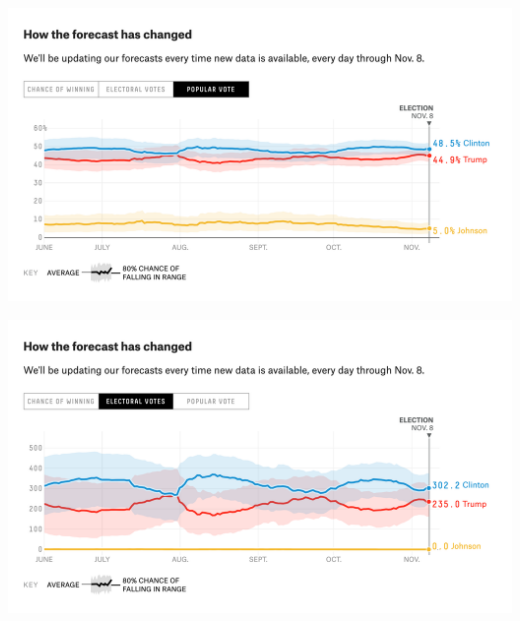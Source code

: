 \documentclass[aspectratio=169]{beamer}
\theoremstyle{principle}
\begin{document}
\begin{frame}

\begin{center}
\includegraphics[scale=0.4]{forecast-pop.png}
\end{center}

\end{frame}

\begin{frame}

\begin{center}
\includegraphics[scale=0.4]{forecast-ec.png}
\end{center}

\end{frame}
\end{document}
